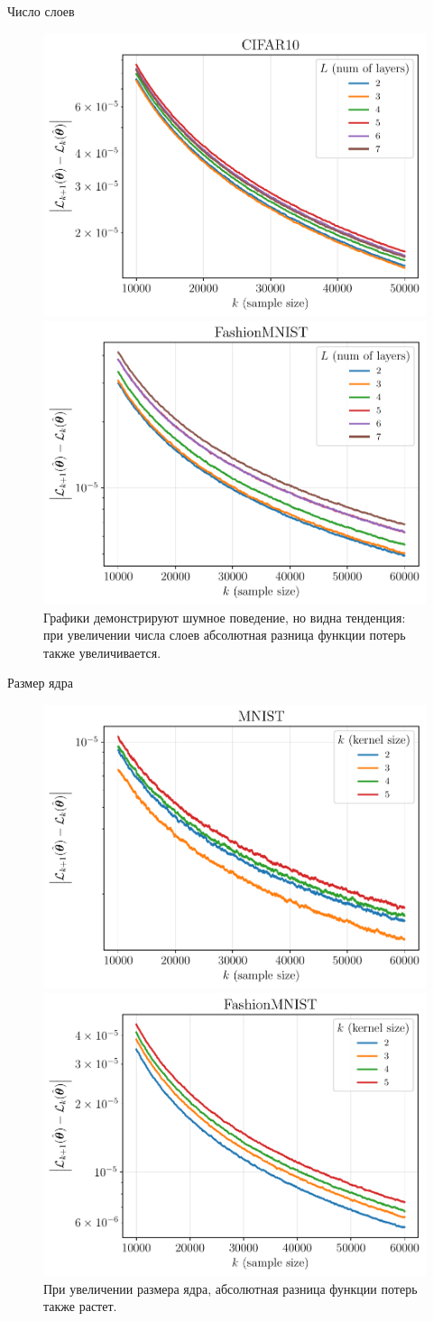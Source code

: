 \documentclass[aspectratio=169]{beamer}
\begin{document}
\begin{frame}{Число слоев}
    \begin{figure}[ht]
        \centering
        \includegraphics[width=0.5\linewidth]{../isp/figs/cifar10_change_layers.pdf}\hfill
        \includegraphics[width=0.5\linewidth]{../isp/figs/fashion_mnist_change_layers.pdf}
        Графики демонстрируют  шумное поведение, но видна тенденция: при увеличении числа слоев абсолютная разница функции потерь также увеличивается.
    \end{figure}
\end{frame}

\begin{frame}{Размер ядра}
    \begin{figure}[ht]
        \centering
        \includegraphics[width=0.5\linewidth]{../isp/figs/mnist_change_kers.pdf}\hfill
        \includegraphics[width=0.5\linewidth]{../isp/figs/fashion_mnist_change_kers.pdf}
        При увеличении размера ядра, абсолютная разница функции потерь также растет.
    \end{figure}
\end{frame}
\end{document}

